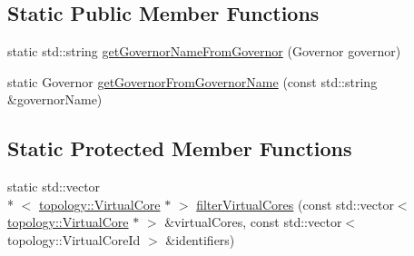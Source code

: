 \subsection*{Static Public Member Functions}
\begin{DoxyCompactItemize}
\item 
static std\-::string \hyperlink{classmammut_1_1cpufreq_1_1CpuFreq_a5939ceaaa900f083efee26b7c4fb4732}{get\-Governor\-Name\-From\-Governor} (Governor governor)
\item 
static Governor \hyperlink{classmammut_1_1cpufreq_1_1CpuFreq_a9c86322811a02a3ffb3bce5cb31884d3}{get\-Governor\-From\-Governor\-Name} (const std\-::string \&governor\-Name)
\end{DoxyCompactItemize}
\subsection*{Static Protected Member Functions}
\begin{DoxyCompactItemize}
\item 
static std\-::vector\\*
$<$ \hyperlink{classmammut_1_1topology_1_1VirtualCore}{topology\-::\-Virtual\-Core} $\ast$ $>$ \hyperlink{classmammut_1_1cpufreq_1_1CpuFreq_a62795ed1740117dcee4485d56ad39991}{filter\-Virtual\-Cores} (const std\-::vector$<$ \hyperlink{classmammut_1_1topology_1_1VirtualCore}{topology\-::\-Virtual\-Core} $\ast$ $>$ \&virtual\-Cores, const std\-::vector$<$ topology\-::\-Virtual\-Core\-Id $>$ \&identifiers)
\end{DoxyCompactItemize}


